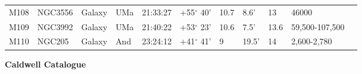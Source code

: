 \begin{longtable}{@{}lllllllllll@{}}
M108       & NGC3556     & Galaxy     & UMa       & 21:33:27 & +55$^{\circ}$ 40'  & 10.7      & 8.6'                 & 13       & 46000               &                                           \\
M109       & NGC3992     & Galaxy     & UMa       & 21:40:22 & +53$^{\circ}$ 23'  & 10.6      & 7.5'                 & 13.6     & 59,500-107,500      &                                           \\
M110       & NGC205      & Galaxy     & And       & 23:24:12 & +41$^{\circ}$ 41'  & 9         & 19.5'                & 14       & 2,600-2,780         &                                           \\
\hline
\end{longtable}




\clearpage
\hspace{6 mm}
{\bf Caldwell Catalogue} 
